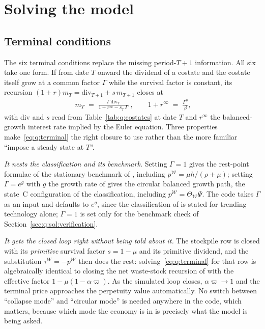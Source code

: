 \section{Solving the model}\label{sec:q:sol}

\subsection{Terminal conditions}\label{sec:q:sol:terminal}

The six terminal conditions replace the missing period-$T{+}1$ information. All six take one form. If from date $T$ onward the dividend of a costate and the costate itself grow at a common factor $\Gamma$ while the survival factor is constant, its recursion $\left(1+r\right)m_T=\mathrm{div}_{T+1}+s\,m_{T+1}$ closes at
\begin{align}
\boxed{\;m_T \;=\; \frac{\Gamma\,\mathrm{div}_T}{1+r^{\infty}-s_T\,\Gamma}\;},
\qquad
1+r^{\infty} \;=\; \frac{\Gamma^{\eta}}{\beta},
\label{eq:q:terminal}
\end{align}
with $\mathrm{div}$ and $s$ read from Table~\ref{tab:q:costates} at date $T$ and $r^{\infty}$ the balanced-growth interest rate implied by the Euler equation. Three properties make~\eqref{eq:q:terminal} the right closure to use rather than the more familiar ``impose a steady state at $T$''.

\emph{It nests the classification and its benchmark.} Setting $\Gamma=1$ gives the rest-point formulae of the stationary benchmark of , including $p^{\mathcal W}=\mu h/\left(\rho+\mu\right)$; setting $\Gamma=e^{g}$ with $g$ the growth rate of  gives the circular balanced growth path, the state~C configuration of the classification, including $p^{\mathcal W}=\Theta_{\mathcal W}\Psi$. The code takes $\Gamma$ as an input and defaults to $e^{g}$, since the classification of \theorynote{} is stated for trending technology alone; $\Gamma=1$ is set only for the benchmark check of Section~\ref{sec:q:sol:verification}.

\emph{It gets the closed loop right without being told about it.} The stockpile row is closed with its \emph{primitive} survival factor $s=1-\mu$ and its primitive dividend, and the substitution $\tau^W=-p^{\mathcal W}$ then does the rest: solving~\eqref{eq:q:terminal} for that row is algebraically identical to closing the net waste-stock recursion of  with the effective factor $1-\mu\left(1-\alpha\varpi\right)$. As the simulated loop closes, $\alpha\varpi\to1$ and the terminal price approaches the perpetuity value automatically. No switch between ``collapse mode'' and ``circular mode'' is needed anywhere in the code, which matters, because which mode the economy is in is precisely what the model is being asked.

